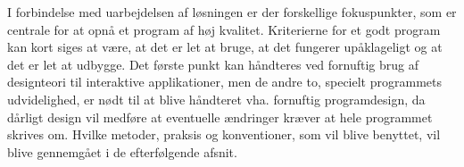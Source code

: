 I forbindelse med uarbejdelsen af løsningen er der forskellige fokuspunkter, som er centrale for at opnå et program af høj kvalitet. Kriterierne for et godt program kan kort siges at være, at det er let at bruge, at det fungerer upåklageligt og at det er let at udbygge. Det første punkt kan håndteres ved fornuftig brug af designteori til interaktive applikationer, men de andre to, specielt programmets udvidelighed, er nødt til at blive håndteret vha. fornuftig programdesign, da dårligt design vil medføre at eventuelle ændringer kræver at hele programmet skrives om. Hvilke metoder, praksis og konventioner, som vil blive benyttet, vil blive gennemgået i de efterfølgende afsnit.